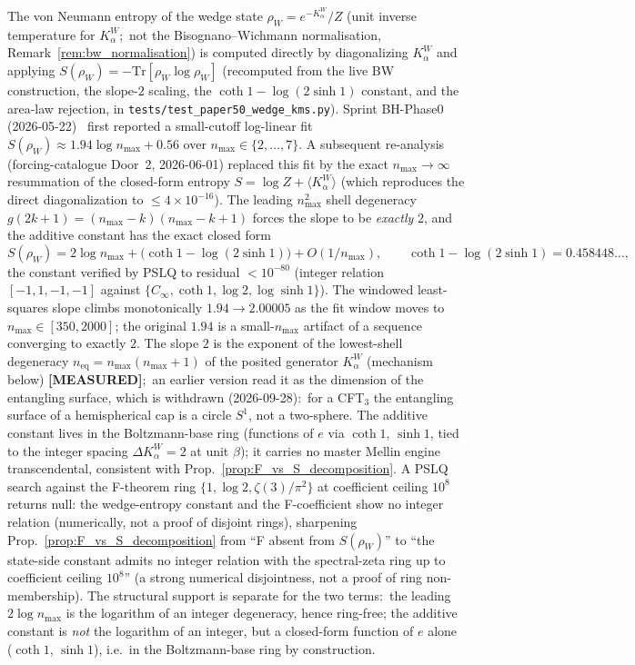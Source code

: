 \documentclass[11pt,a4paper]{article}
\theoremstyle{plain}
\theoremstyle{definition}
\newcommand{\nmax}{n_{\max}}
\newcommand{\Tr}{\mathrm{Tr}}
\newcommand{\Kalpha}{K_{\alpha}^{W}}
\newcommand{\rhoW}{\rho_{W}}
\begin{document}
The von Neumann entropy of the wedge state $\rhoW = e^{-\Kalpha}/Z$
(unit inverse temperature for $\Kalpha$;\ not the Bisognano--Wichmann
normalisation, Remark~\ref{rem:bw_normalisation}) is computed directly by
diagonalizing $\Kalpha$ and applying $S(\rhoW) = -\Tr[\rhoW \log
\rhoW]$ (recomputed from the live BW construction, the slope-$2$
scaling, the $\coth 1 - \log(2\sinh 1)$ constant, and the area-law
rejection, in \texttt{tests/test\_paper50\_wedge\_kms.py}). Sprint BH-Phase0
(2026-05-22)~\cite{debug:bh_phase0} first reported a small-cutoff
log-linear fit $S(\rhoW) \approx 1.94 \log\nmax + 0.56$ over $\nmax
\in \{2, \dots, 7\}$. A subsequent re-analysis (forcing-catalogue
Door~2, 2026-06-01)
replaced this fit by the exact $\nmax \to \infty$ resummation of the
closed-form entropy $S = \log Z + \langle \Kalpha \rangle$ (which
reproduces the direct diagonalization to $\le 4 \times 10^{-16}$).
The leading $\nmax^{2}$ shell degeneracy $g(2k+1) = (\nmax - k)(\nmax
- k + 1)$ forces the slope to be \emph{exactly} $2$, and the additive
constant has the exact closed form
\begin{equation}
S(\rhoW) = 2 \log \nmax + \big(\coth 1 - \log(2 \sinh 1)\big)
+ O(1/\nmax), \qquad \coth 1 - \log(2 \sinh 1) = 0.458448\ldots,
\label{eq:S_W_fit}
\end{equation}
the constant verified by PSLQ to residual $< 10^{-80}$ (integer
relation $[-1, 1, -1, -1]$ against $\{C_\infty, \coth 1, \log 2, \log
\sinh 1\}$). The windowed least-squares slope climbs monotonically
$1.94 \to 2.00005$ as the fit window moves to $\nmax \in [350,
2000]$; the original $1.94$ is a small-$\nmax$ artifact of a sequence
converging to exactly $2$. The slope $2$ is the exponent of the
lowest-shell degeneracy $n_{\mathrm{eq}} = \nmax(\nmax + 1)$ of the
posited generator $\Kalpha$ (mechanism below) \textbf{[MEASURED]};\ an
earlier version read it as the dimension of the entangling surface,
which is withdrawn (2026-09-28):\ for a CFT$_{3}$ the entangling surface
of a hemispherical cap is a circle $S^{1}$, not a two-sphere. The
additive constant lives in the Boltzmann-base ring (functions of $e$
via $\coth 1$, $\sinh 1$, tied to the integer spacing
$\Delta\Kalpha = 2$ at unit $\beta$); it carries no master Mellin
engine transcendental, consistent with
Prop.~\ref{prop:F_vs_S_decomposition}. A PSLQ search against the
F-theorem ring $\{1, \log 2, \zeta(3)/\pi^{2}\}$ at coefficient
ceiling $10^{8}$ returns null: the wedge-entropy constant and the
F-coefficient show no integer relation (numerically, not a proof of disjoint rings), sharpening
Prop.~\ref{prop:F_vs_S_decomposition} from ``F absent from $S(\rhoW)$''
to ``the state-side constant admits no integer relation with the
spectral-zeta ring up to coefficient ceiling $10^{8}$'' (a strong
numerical disjointness, not a proof of ring non-membership).  The
structural support is separate for the two terms:\ the leading
$2\log\nmax$ is the logarithm of an integer degeneracy, hence ring-free;
the additive constant is \emph{not} the logarithm of an integer, but a
closed-form function of $e$ alone ($\coth 1$, $\sinh 1$), i.e.\ in the
Boltzmann-base ring by construction.
\end{document}
